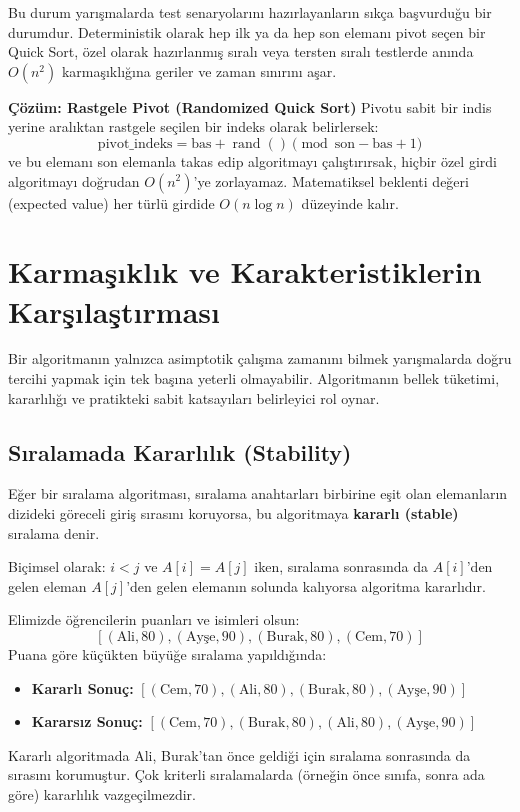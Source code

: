 Bu durum yarışmalarda test senaryolarını hazırlayanların sıkça başvurduğu bir durumdur. Deterministik olarak hep ilk ya da hep son elemanı pivot seçen bir Quick Sort, özel olarak hazırlanmış sıralı veya tersten sıralı testlerde anında $O(n^2)$ karmaşıklığına geriler ve zaman sınırını aşar.

\textbf{Çözüm: Rastgele Pivot (Randomized Quick Sort)}
Pivotu sabit bir indis yerine aralıktan rastgele seçilen bir indeks olarak belirlersek:
\[
\text{pivot\_indeks} = \text{bas} + \operatorname{rand}() \pmod{\text{son} - \text{bas} + 1}
\]
ve bu elemanı son elemanla takas edip algoritmayı çalıştırırsak, hiçbir özel girdi algoritmayı doğrudan $O(n^2)$'ye zorlayamaz. Matematiksel beklenti değeri (expected value) her türlü girdide $O(n \log n)$ düzeyinde kalır.

\section{Karmaşıklık ve Karakteristiklerin Karşılaştırması}

Bir algoritmanın yalnızca asimptotik çalışma zamanını bilmek yarışmalarda doğru tercihi yapmak için tek başına yeterli olmayabilir. Algoritmanın bellek tüketimi, kararlılığı ve pratikteki sabit katsayıları belirleyici rol oynar.

\subsection{Sıralamada Kararlılık (Stability)}

\begin{definition}
Eğer bir sıralama algoritması, sıralama anahtarları birbirine eşit olan elemanların dizideki göreceli giriş sırasını koruyorsa, bu algoritmaya \textbf{kararlı (stable)} sıralama denir.

Biçimsel olarak: $i < j$ ve $A[i] = A[j]$ iken, sıralama sonrasında da $A[i]$'den gelen eleman $A[j]$'den gelen elemanın solunda kalıyorsa algoritma kararlıdır.
\end{definition}

\begin{example}
Elimizde öğrencilerin puanları ve isimleri olsun:
\[
[(\text{Ali}, 80), (\text{Ayşe}, 90), (\text{Burak}, 80), (\text{Cem}, 70)]
\]
Puana göre küçükten büyüğe sıralama yapıldığında:
\begin{itemize}
    \item \textbf{Kararlı Sonuç:} $[(\text{Cem}, 70), (\text{Ali}, 80), (\text{Burak}, 80), (\text{Ayşe}, 90)]$
    \item \textbf{Kararsız Sonuç:} $[(\text{Cem}, 70), (\text{Burak}, 80), (\text{Ali}, 80), (\text{Ayşe}, 90)]$
\end{itemize}
Kararlı algoritmada Ali, Burak'tan önce geldiği için sıralama sonrasında da sırasını korumuştur. Çok kriterli sıralamalarda (örneğin önce sınıfa, sonra ada göre) kararlılık vazgeçilmezdir.
\end{example}

